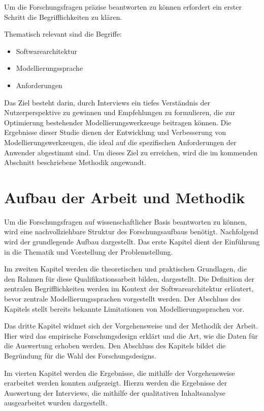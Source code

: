 Um die Forschungsfragen präzise beantworten zu können erfordert ein erster Schritt die Begrifflichkeiten zu klären.

Thematisch relevant sind die Begriffe:
\begin{itemize}
  \item Softwarearchitektur
  \item Modellierungssprache
  \item Anforderungen
\end{itemize}


Das Ziel besteht darin, durch Interviews ein tiefes Verständnis der Nutzerperspektive zu gewinnen und Empfehlungen zu formulieren, die zur Optimierung bestehender Modellierungswerkzeuge beitragen können. Die Ergebnisse dieser Studie dienen der Entwicklung und Verbesserung von Modellierungswerkzeugen, die ideal auf die spezifischen Anforderungen der Anwender abgestimmt sind.
Um dieses Ziel zu erreichen, wird die im kommenden Abschnitt beschriebene Methodik angewandt.

\section{Aufbau der Arbeit und Methodik}

Um die Forschungsfragen auf wissenschaftlicher Basis beantworten zu können, wird eine nachvollziehbare Struktur des Forschungsaufbaus benötigt. Nachfolgend wird der grundlegende Aufbau dargestellt. Das erste Kapitel dient der Einführung in die Thematik und Vorstellung der Problemstellung.

Im zweiten Kapitel werden die theoretischen und praktischen Grundlagen, die den Rahmen für diese Qualifikationsarbeit bilden, dargestellt. Die Definition der zentralen Begrifflichkeiten werden im Kontext der Softwarearchitektur erläutert, bevor zentrale Modellierungssprachen vorgestellt werden. Der Abschluss des Kapitels stellt bereits bekannte Limitationen von Modellierungssprachen vor.

Das dritte Kapitel widmet sich der Vorgehensweise und der Methodik der Arbeit. Hier wird das empirische Forschungsdesign erklärt und die Art, wie die Daten für die Auswertung erhoben werden.
Den Abschluss des Kapitels bildet die Begründung für die Wahl des Forschungsdesigns.

Im vierten Kapitel werden die Ergebnisse, die mithilfe der Vorgehensweise erarbeitet werden konnten aufgezeigt. Hierzu werden die Ergebnisse der Auswertung der Interviews, die mithilfe der qualitativen Inhaltsanalyse ausgearbeitet wurden dargestellt.

